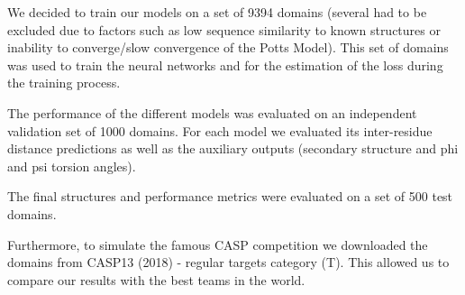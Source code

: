 We decided to train our models on a set of 9394 domains (several had to be excluded due to factors such as low sequence similarity to known structures or inability to converge/slow convergence of the Potts Model). This set of domains was used to train the neural networks and for the estimation of the loss during the training process.

The performance of the different models was evaluated on an independent validation set of 1000 domains. For each model we evaluated its inter-residue distance predictions as well as the auxiliary outputs (secondary structure and phi and psi torsion angles).

The final structures and performance metrics were evaluated on a set of 500 test domains.
    
Furthermore, to simulate the famous CASP competition we downloaded the domains from CASP13 (2018) - regular targets category (T). This allowed us to compare our results with the best teams in the world.